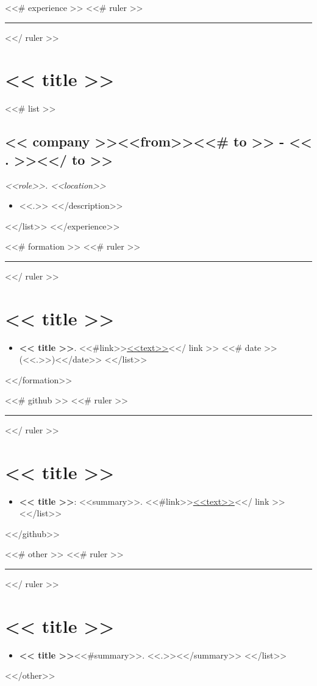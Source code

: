 \documentclass[<<fontsize>>]{article}
\def\resumeruler{\begin{center}\rule{0.5\linewidth}{0.5pt}\end{center}}
\providecommand{\tightlist}{%
  \setlength{\itemsep}{0pt}\setlength{\parskip}{0pt}}
\begin{document}

<<# experience >>
<<# ruler >>\resumeruler<</ ruler >>
\section{<< title >>}

<<# list >>
\subsection{<< company >>\hfill \small <<from>><<# to >> - << . >><</ to >>}
\textit{<<role>>. <<location>>}
\begin{itemize}
  \tightlist
  <<#description>>
  \item <<.>>
  <</description>>
\end{itemize}
<</list>>
<</experience>>



<<# formation >>
<<# ruler >>\resumeruler<</ ruler >>
\section{<< title >>}

\begin{itemize}
  \tightlist
  <<# list >>
    \item \textbf{<< title >>}. <<#link>>\href{<<to>>}{<<text>>}<</ link >> <<# date >>(<<.>>)<</date>>
  <</list>>
\end{itemize}
<</formation>>


<<# github >>
<<# ruler >>\resumeruler<</ ruler >>
\section{<< title >>}

\begin{itemize}
  \tightlist
  <<# list >>
    \item \textbf{<< title >>}: <<summary>>. <<#link>>\href{<<to>>}{<<text>>}<</ link >>
  <</list>>
\end{itemize}
<</github>>


<<# other >>
<<# ruler >>\resumeruler<</ ruler >>
\section{<< title >>}

\begin{itemize}
  \tightlist
  <<# list >>
    \item \textbf{<< title >>}<<#summary>>. <<.>><</summary>>
  <</list>>
\end{itemize}
<</other>>
\end{document}
